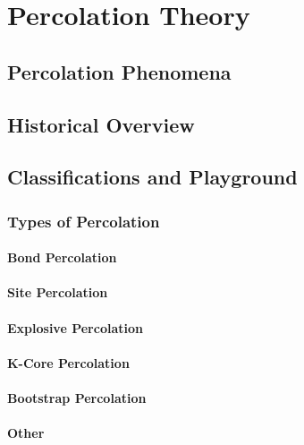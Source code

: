 \chapter{Percolation Theory}

\ifpdf
    \graphicspath{{Chapter4/Figs/}}
\else
    \graphicspath{{Chapter4/Figs/}}
\fi

\section{Percolation Phenomena}
\section{Historical Overview}
\section{Classifications and Playground}
	\subsection{Types of Percolation}
		\subsubsection{Bond Percolation}	
		\subsubsection{Site Percolation}
		\subsubsection{Explosive Percolation}
		\subsubsection{K-Core Percolation}
		\subsubsection{Bootstrap Percolation}
		\subsubsection{Other}
